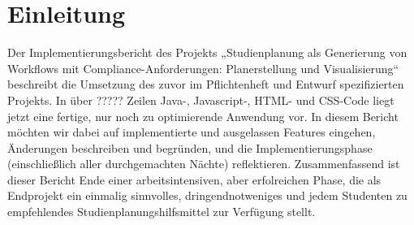 \section{Einleitung}
Der Implementierungsbericht des Projekts „Studienplanung als Generierung von Workflows mit Compliance-Anforderungen: Planerstellung und Visualisierung“ beschreibt die Umsetzung des zuvor im Pflichtenheft und Entwurf spezifizierten Projekts. In über ????? Zeilen Java-, Javascript-, HTML- und CSS-Code liegt jetzt eine fertige, nur noch zu optimierende Anwendung vor. In diesem Bericht möchten wir dabei auf implementierte und ausgelassen Features eingehen, Änderungen beschreiben und begründen, und die Implementierungsphase (einschließlich aller durchgemachten Nächte) reflektieren.
Zusammenfassend ist dieser Bericht Ende einer arbeitsintensiven, aber erfolreichen Phase, die als Endprojekt ein einmalig sinnvolles, dringendnotweniges und jedem Studenten zu empfehlendes Studienplanungshilfsmittel zur Verfügung stellt.


